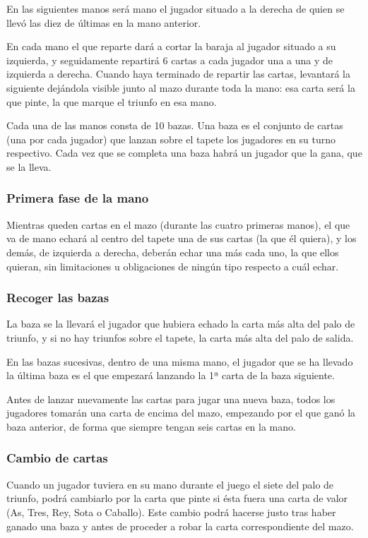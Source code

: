 \documentclass{article}
\begin{document}
En las siguientes manos será mano el jugador situado a la derecha de quien se llevó las diez de últimas en la mano anterior.

En cada mano el que reparte dará a cortar la baraja al jugador situado a su izquierda, y seguidamente repartirá 6 cartas a cada jugador una a una y de izquierda a derecha. Cuando haya terminado de repartir las cartas, levantará la siguiente dejándola visible junto al mazo durante toda la mano: esa carta será la que pinte, la que marque el triunfo en esa mano.

Cada una de las manos consta de 10 bazas. Una baza es el conjunto de cartas (una por cada jugador) que lanzan sobre el tapete los jugadores en su turno respectivo. Cada vez que se completa una baza habrá un jugador que la gana, que se la lleva.
\subsubsection*{Primera fase de la mano}
Mientras queden cartas en el mazo (durante las cuatro primeras manos), el que va de mano echará al centro del tapete una de sus cartas (la que él quiera), y los demás, de izquierda a derecha, deberán echar una más cada uno, la que ellos quieran, sin limitaciones u obligaciones de ningún tipo respecto a cuál echar.

\subsubsection*{Recoger las bazas}

La baza se la llevará el jugador que hubiera echado la carta más alta del palo de triunfo, y si no hay triunfos sobre el tapete, la carta más alta del palo de salida.

En las bazas sucesivas, dentro de una misma mano, el jugador que se ha llevado la última baza es el que empezará lanzando la 1ª carta de la baza siguiente.

Antes de lanzar nuevamente las cartas para jugar una nueva baza, todos los jugadores tomarán una carta de encima del mazo, empezando por el que ganó la baza anterior, de forma que siempre tengan seis cartas en la mano.

\subsubsection*{Cambio de cartas}

Cuando un jugador tuviera en su mano durante el juego el siete del palo de triunfo, podrá cambiarlo por la carta que pinte si ésta fuera una carta de valor (As, Tres, Rey, Sota o Caballo). Este cambio podrá hacerse justo tras haber ganado una baza y antes de proceder a robar la carta correspondiente del mazo.
\end{document}
